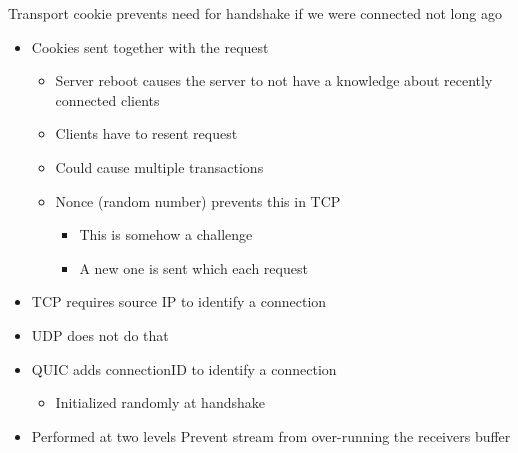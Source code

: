 \begin{itemize}
\begin{itemize}
\begin{itemize}
                     Transport cookie prevents need for handshake if we were connected not long ago
                        \begin{itemize}
                            \item Cookies sent together with the request
                                \begin{itemize}
                                    \item Server reboot causes the server to not have a knowledge about recently connected clients
                                    \item Clients have to resent request
                                    \item Could cause multiple transactions
                                    \item Nonce (random number) prevents this in TCP
                                        \begin{itemize}
                                            \item This is somehow a challenge
                                            \item A new one is sent which each request
                                        \end{itemize}
                                \end{itemize}
                        \end{itemize}
                \end{itemize}
                \begin{itemize}
                    \item TCP requires source IP to identify a connection
                    \item UDP does not do that
                    \item QUIC adds connectionID to identify a connection
                        \begin{itemize}
                            \item Initialized randomly at handshake
                        \end{itemize}
                \end{itemize}
                \begin{itemize}
                    \item Performed at two levels
                         Prevent stream from over-running the receivers buffer

\end{itemize}
\end{itemize}
\end{itemize}
